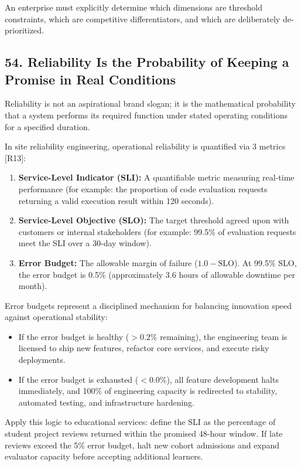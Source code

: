 An enterprise must explicitly determine which dimensions are threshold constraints, which are competitive differentiators, and which are deliberately de-prioritized.

\subsection*{54. Reliability Is the Probability of Keeping a Promise in Real Conditions}

Reliability is not an aspirational brand slogan; it is the mathematical probability that a system performs its required function under stated operating conditions for a specified duration.

In site reliability engineering, operational reliability is quantified via 3 metrics [R13]:
\begin{enumerate}
    \item \textbf{Service-Level Indicator (SLI):} A quantifiable metric measuring real-time performance (for example: the proportion of code evaluation requests returning a valid execution result within 120 seconds).
    \item \textbf{Service-Level Objective (SLO):} The target threshold agreed upon with customers or internal stakeholders (for example: 99.5\% of evaluation requests meet the SLI over a 30-day window).
    \item \textbf{Error Budget:} The allowable margin of failure ($1.0 - \text{SLO}$). At 99.5\% SLO, the error budget is 0.5\% (approximately 3.6 hours of allowable downtime per month).
\end{enumerate}

Error budgets represent a disciplined mechanism for balancing innovation speed against operational stability:
\begin{itemize}
    \item If the error budget is healthy ($> 0.2\%$ remaining), the engineering team is licensed to ship new features, refactor core services, and execute risky deployments.
    \item If the error budget is exhausted ($< 0.0\%$), all feature development halts immediately, and 100\% of engineering capacity is redirected to stability, automated testing, and infrastructure hardening.
\end{itemize}

Apply this logic to educational services: define the SLI as the percentage of student project reviews returned within the promised 48-hour window. If late reviews exceed the 5\% error budget, halt new cohort admissions and expand evaluator capacity before accepting additional learners.

